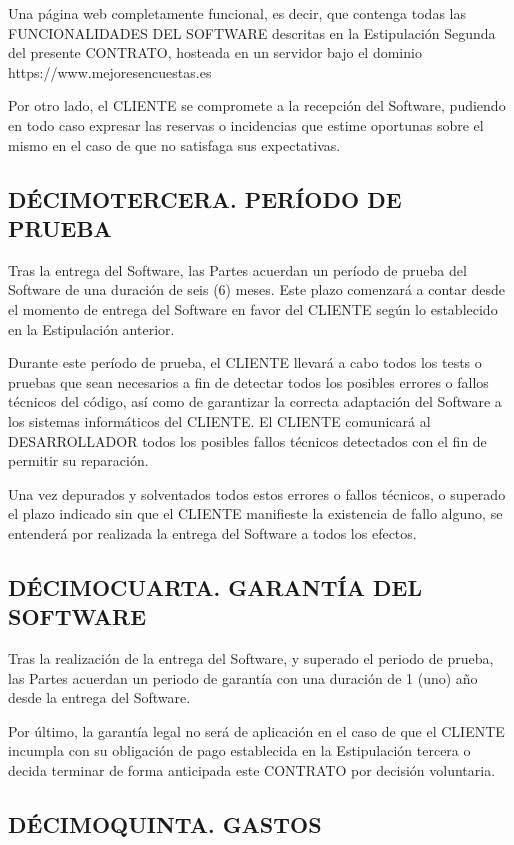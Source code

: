 \documentclass[a4paper,11pt]{report}
\begin{document}
	Una página web completamente funcional, es decir, que contenga todas las
	FUNCIONALIDADES DEL SOFTWARE descritas en la Estipulación Segunda del presente
	CONTRATO, hosteada en un servidor bajo el dominio https://www.mejoresencuestas.es

	Por otro lado, el CLIENTE se compromete a la recepción del Software,
	pudiendo en todo caso expresar las reservas o incidencias que estime
	oportunas sobre el mismo en el caso de que no satisfaga sus
	expectativas.

	\subsection*{DÉCIMOTERCERA. PERÍODO DE PRUEBA}

	Tras la entrega del Software, las Partes acuerdan un período de prueba
	del Software de una duración de seis (6) meses. Este plazo comenzará a contar
	desde el momento de entrega del Software en favor del CLIENTE según lo
	establecido en la Estipulación anterior.

	Durante este período de prueba, el CLIENTE llevará a cabo todos los
	tests o pruebas que sean necesarios a fin de detectar todos los posibles
	errores o fallos técnicos del código, así como de garantizar la correcta
	adaptación del Software a los sistemas informáticos del CLIENTE. El
	CLIENTE comunicará al DESARROLLADOR todos los posibles fallos técnicos
	detectados con el fin de permitir su reparación.

	Una vez depurados y solventados todos estos errores o fallos técnicos, o
	superado el plazo indicado sin que el CLIENTE manifieste la existencia
	de fallo alguno, se entenderá por realizada la entrega del Software a
	todos los efectos.

	\subsection*{DÉCIMOCUARTA. GARANTÍA DEL SOFTWARE}

	Tras la realización de la entrega del Software, y superado el periodo de
	prueba, las Partes acuerdan un periodo de garantía con una duración
	de 1 (uno) año desde la entrega del Software.

	Por último, la garantía legal no será de aplicación en el caso de que el
	CLIENTE incumpla con su obligación de pago establecida en la
	Estipulación tercera o decida terminar de forma anticipada este CONTRATO
	por decisión voluntaria.

	\subsection*{DÉCIMOQUINTA. GASTOS}
\end{document}
